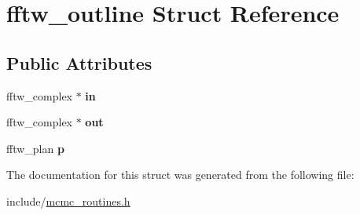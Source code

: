 \hypertarget{structfftw__outline}{}\section{fftw\+\_\+outline Struct Reference}
\label{structfftw__outline}
\subsection*{Public Attributes}
\begin{DoxyCompactItemize}
\item 
\mbox{\label{structfftw__outline_abd3c18149bf7fedd74f18f36f1148a6e}} 
fftw\+\_\+complex $\ast$ {\bfseries in}
\item 
\mbox{\label{structfftw__outline_a9b52b935e2b3a1ed2a3884842619a152}} 
fftw\+\_\+complex $\ast$ {\bfseries out}
\item 
\mbox{\label{structfftw__outline_a42f638a5f1b1792685c1897c6cb746ef}} 
fftw\+\_\+plan {\bfseries p}
\end{DoxyCompactItemize}


The documentation for this struct was generated from the following file\+:\begin{DoxyCompactItemize}
\item 
include/\hyperlink{mcmc__routines_8h}{mcmc\+\_\+routines.\+h}\end{DoxyCompactItemize}
